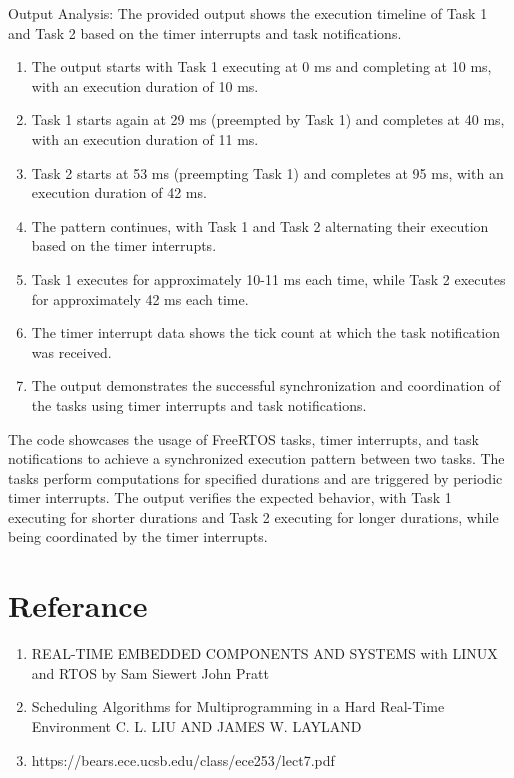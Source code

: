 \documentclass[a4paper,11pt]{article}%
\newenvironment{qanda}{\setlength{\parindent}{0pt}}{\bigskip}
\begin{document}
\begin{qanda}
\begin{figure}[!h]
\end{figure}
Output Analysis:
The provided output shows the execution timeline of Task 1 and Task 2 based on the timer interrupts and task notifications.
\begin{enumerate}
	\item  The output starts with Task 1 executing at 0 ms and completing at 10 ms, with an execution duration of 10 ms.
	\item Task 1 starts again at 29 ms (preempted by Task 1) and completes at 40 ms, with an execution duration of 11 ms.
	\item Task 2 starts at 53 ms (preempting Task 1) and completes at 95 ms, with an execution duration of 42 ms.
	\item The pattern continues, with Task 1 and Task 2 alternating their execution based on the timer interrupts.
	\item Task 1 executes for approximately 10-11 ms each time, while Task 2 executes for approximately 42 ms each time.
	\item  The timer interrupt data shows the tick count at which the task notification was received.
	\item The output demonstrates the successful synchronization and coordination of the tasks using timer interrupts and task notifications.
\end{enumerate}



The code showcases the usage of FreeRTOS tasks, timer interrupts, and task notifications to achieve a synchronized execution pattern between two tasks. The tasks perform computations for specified durations and are triggered by periodic timer interrupts. The output verifies the expected behavior, with Task 1 executing for shorter durations and Task 2 executing for longer durations, while being coordinated by the timer interrupts.




\end{qanda}
\pagebreak

\section{Referance}
\begin{enumerate}
	\item REAL-TIME EMBEDDED COMPONENTS AND SYSTEMS with LINUX and RTOS by Sam Siewert John Pratt
	\item Scheduling Algorithms for Multiprogramming in a Hard Real-Time Environment C. L. LIU AND JAMES W. LAYLAND
	\item https://bears.ece.ucsb.edu/class/ece253/lect7.pdf
\end{enumerate}
\end{document}
